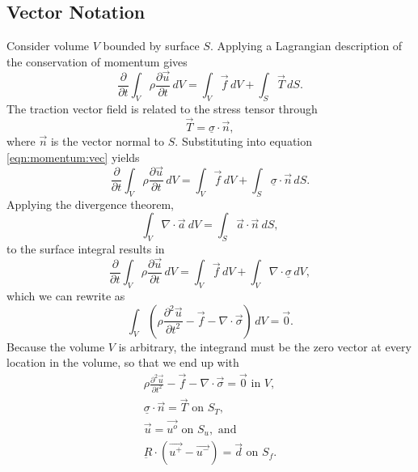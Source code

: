 \subsection{Vector Notation}

Consider volume $V$ bounded by surface $S$. Applying a Lagrangian
description of the conservation of momentum gives
\begin{equation}
\label{eqn:momentum:vec}
\frac{\partial}{\partial t}\int_{V}\rho\frac{\partial\vec{u}}{\partial t}\, dV=\int_{V}\overrightarrow{f}\, dV+\int_{S}\overrightarrow{T}\, dS.
\end{equation}
The traction vector field is related to the stress tensor through
\begin{equation}
\overrightarrow{T}=\underline{\sigma}\cdot\overrightarrow{n},
\end{equation}
where $\overrightarrow{n}$ is the vector normal to $S$. Substituting
into equation \vref{eqn:momentum:vec} yields
\begin{equation}
\frac{\partial}{\partial t}\int_{V}\rho\frac{\partial\overrightarrow{u}}{\partial t}\, dV=\int_{V}\overrightarrow{f}\, dV+\int_{S}\underline{\sigma}\cdot\overrightarrow{n}\, dS.
\end{equation}
Applying the divergence theorem,
\begin{equation}
\int_{V}\nabla\cdot\overrightarrow{a}\: dV=\int_{S}\overrightarrow{a}\cdot\overrightarrow{n}\: dS,
\end{equation}
to the surface integral results in
\begin{equation}
\frac{\partial}{\partial t}\int_{V}\rho\frac{\partial\overrightarrow{u}}{\partial t}\, dV=\int_{V}\overrightarrow{f}\, dV+\int_{V}\nabla\cdot\underline{\sigma}\, dV,
\end{equation}
which we can rewrite as
\begin{equation}
\int_{V}\left(\rho\frac{\partial^{2}\overrightarrow{u}}{\partial t^{2}}-\overrightarrow{f}-\nabla\cdot\overrightarrow{\sigma}\right)\, dV=\vec{0}.
\end{equation}
Because the volume $V$ is arbitrary, the integrand must be the zero
vector at every location in the volume, so that we end up with
\begin{gather}
\rho\frac{\partial^{2}\overrightarrow{u}}{\partial t^{2}}-\overrightarrow{f}-\nabla\cdot\overrightarrow{\sigma}=\vec{0}\text{ in }V,\\
\underline{\sigma}\cdot\overrightarrow{n}=\overrightarrow{T}\text{ on }S_{T}\text{,}\\
\overrightarrow{u}=\overrightarrow{u^{o}}\text{ on }S_{u},\text{ and}\\
\underbar{R}\cdot(\vec{u^{+}}-\vec{u^{-}})=\vec{d}\text{ on }S_{f}.
\end{gather}
